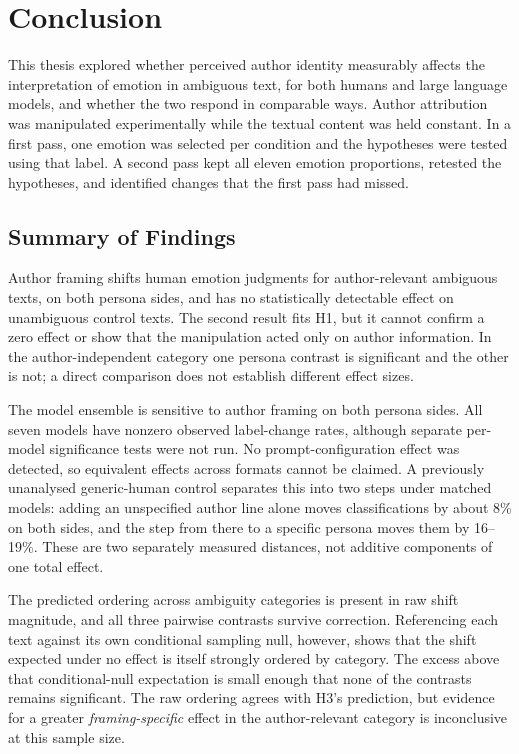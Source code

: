 \chapter{Conclusion}
\label{c:conclusion}

\noindent
This thesis explored whether perceived author identity measurably affects the interpretation of
emotion in ambiguous text, for both humans and large language models, and whether the two respond
in comparable ways. Author attribution was manipulated experimentally while the textual content
was held constant. In a first pass, one emotion was selected per condition and the hypotheses were
tested using that label. A second pass kept all eleven emotion proportions, retested the
hypotheses, and identified changes that the first pass had missed.

\section{Summary of Findings}
\label{conc:summary}

\noindent
Author framing shifts human emotion judgments for author-relevant ambiguous texts, on both persona
sides, and has no statistically detectable effect on unambiguous control texts. The second result
fits H1, but it cannot confirm a zero effect or show that the manipulation acted only on author
information. In the author-independent category one persona contrast is significant and the other
is not; a direct comparison does not establish different effect sizes.

The model ensemble is sensitive to author framing on both persona sides. All seven models have
nonzero observed label-change rates, although separate per-model significance tests were not run. No
prompt-configuration effect was detected, so equivalent effects across formats cannot be claimed.
A previously unanalysed generic-human control separates this into two steps under matched models:
adding an unspecified author line alone moves classifications by about 8\% on both sides, and the
step from there to a specific persona moves them by 16--19\%. These are two separately
measured distances, not additive components of one total effect.

The predicted ordering across ambiguity categories is present in raw shift magnitude, and all
three pairwise contrasts survive correction. Referencing each text against its own conditional
sampling null, however, shows that the shift expected under no effect is itself strongly ordered
by category. The excess above that conditional-null expectation is small enough that none of the
contrasts remains significant. The raw ordering agrees with H3's prediction, but evidence for a
greater \emph{framing-specific} effect in the author-relevant category is inconclusive at this
sample size.


